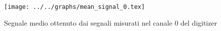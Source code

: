 \begin{figure}[h] \centering\texttt{[image: ../../graphs/mean\_signal\_0.tex]}\caption{Segnale medio ottenuto dai segnali misurati nel canale 0 del digitizer}\label{gr:mean_signal_0} \end{figure}
